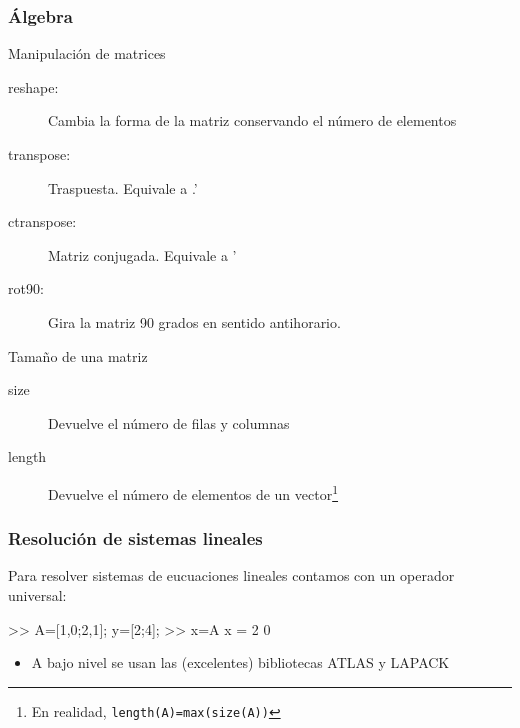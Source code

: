 \hypertarget{manipulaci-n-de-matrices}{}
\begin{frame}\frametitle{Álgebra}
Manipulación de matrices
\begin{description}
\item [reshape:]
Cambia la forma de la matriz conservando el número de
elementos


\item [transpose:]
Traspuesta. Equivale a .'


\item [ctranspose:]
Matriz conjugada. Equivale a '


\item [rot90:]
Gira la matriz 90 grados en sentido antihorario.


\end{description}
Tamaño de una matriz
\begin{description}
\item[size]  Devuelve el número de filas y columnas
\item[length] Devuelve el número de elementos de un vector\footnote{En
    realidad, \texttt{length(A)=max(size(A))}}
\end{description}

\end{frame}


\begin{frame}[containsverbatim]
\frametitle{Resolución de sistemas lineales}

Para resolver sistemas de eucuaciones lineales contamos con un
operador universal:
\begin{Octave}
>> A=[1,0;2,1]; y=[2;4]; 
>> x=A\y 
x = 
  2 
  0
\end{Octave}
\begin{itemize}\item 
  A bajo nivel se usan las (excelentes) bibliotecas ATLAS y LAPACK
\end{itemize}
\end{frame}

